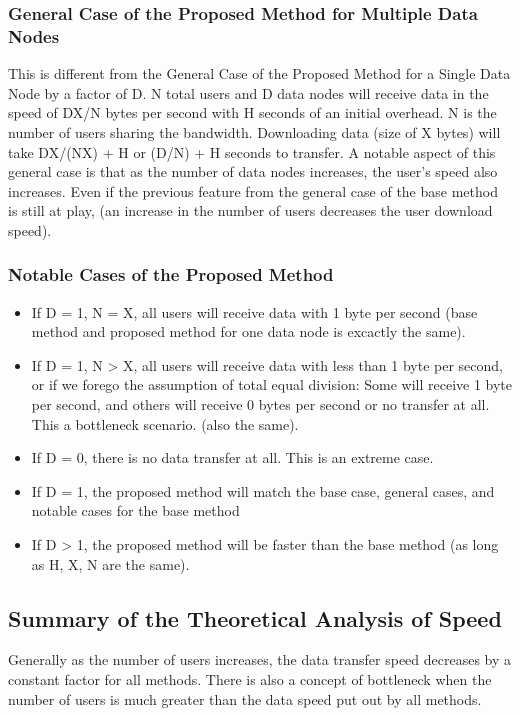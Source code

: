\documentclass[acmsmall]{acmart}
\begin{document}
\begin{multicols}{2}
\subsubsection{General Case of the Proposed Method for Multiple Data Nodes} 
This is different from the General Case of the Proposed Method for a Single Data Node by a factor of D. N total users and D data nodes will receive data in the speed of DX/N bytes per second with H seconds of an initial overhead. N is the number of users sharing the bandwidth. Downloading data (size of X bytes)  will take DX/(NX) + H or (D/N) + H seconds to transfer. A notable aspect of this general case is that as the number of data nodes increases, the user's speed also increases. Even if the previous feature from the general case of the base method is still at play, (an increase in the number of users decreases the user download speed).

\subsubsection{Notable Cases of the Proposed Method}
\begin{itemize}
    \item  If D = 1, N = X, all users will receive data with 1 byte per second (base method and proposed method for one data node is excactly the same).
    \item If D = 1, N > X, all users will receive data with less than 1 byte per second, or if we forego the assumption of total equal division: Some will receive 1 byte per second, and others will receive 0 bytes per second or no transfer at all. This a bottleneck scenario. (also the same).
    \item If D = 0, there is no data transfer at all. This is an extreme case.
    \item If D = 1, the proposed method will match the base case, general cases, and notable cases for the base method
    \item If D > 1, the proposed method will be faster than the base method (as long as H, X, N are the same).
\end{itemize}

\subsection{Summary of the Theoretical Analysis of Speed} \label{theoreticalspeed}
Generally as the number of users increases, the data transfer speed decreases by a constant factor for all methods. There is also a concept of bottleneck when the number of users is much greater than the data speed put out by all methods.


\end{multicols}
\end{document}
